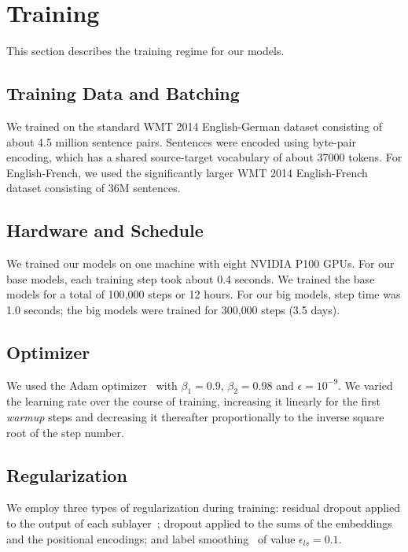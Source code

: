 \documentclass[10pt,letterpaper]{article}
\begin{document}
\section{Training}
This section describes the training regime for our models.

\subsection{Training Data and Batching}
We trained on the standard WMT 2014 English-German dataset consisting of about 4.5
million sentence pairs. Sentences were encoded using byte-pair encoding, which has a
shared source-target vocabulary of about 37000 tokens. For English-French, we used
the significantly larger WMT 2014 English-French dataset consisting of 36M sentences.

\subsection{Hardware and Schedule}
We trained our models on one machine with eight NVIDIA P100 GPUs. For our base
models, each training step took about 0.4 seconds. We trained the base models for a
total of 100{,}000 steps or 12 hours. For our big models, step time was 1.0 seconds;
the big models were trained for 300{,}000 steps (3.5 days).

\subsection{Optimizer}
We used the Adam optimizer~\citep{kingma2015adam} with $\beta_1=0.9$,
$\beta_2=0.98$ and $\epsilon=10^{-9}$. We varied the learning rate over the course
of training, increasing it linearly for the first \emph{warmup} steps and decreasing
it thereafter proportionally to the inverse square root of the step number.

\subsection{Regularization}
We employ three types of regularization during training: residual dropout applied to
the output of each sublayer~\citep{srivastava2014dropout}; dropout applied to the
sums of the embeddings and the positional encodings; and label
smoothing~\citep{szegedy2016rethinking} of value $\epsilon_{ls}=0.1$.

\end{document}
